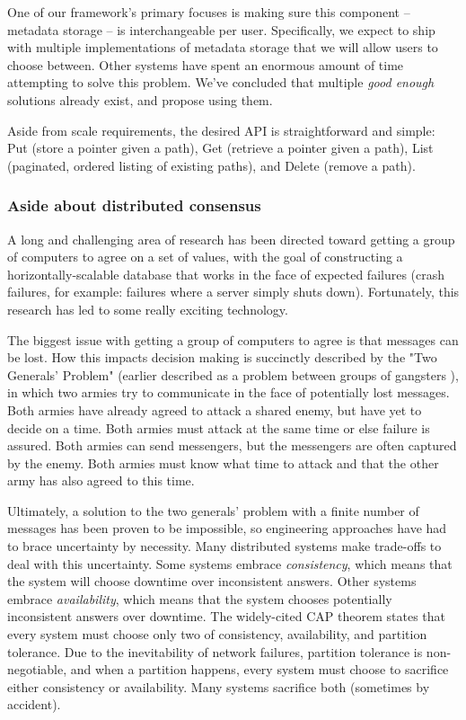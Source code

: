 \documentclass[a4paper,10pt]{article} \usepackage[utf8]{inputenc}
\begin{document}
One of our framework's primary focuses is making sure this component -- metadata
storage -- is interchangeable per user. Specifically, we expect to ship with
multiple implementations of metadata storage that we will allow users to choose
between. Other systems have spent an enormous amount of time attempting to solve
this problem. We've concluded that multiple {\em good enough} solutions already
exist, and propose using them.

Aside from scale requirements, the desired API is straightforward and
simple: Put (store a pointer given a path), Get (retrieve a pointer given a
path), List (paginated, ordered listing of existing paths), and Delete (remove a
path).



\subsubsection{Aside about distributed consensus}

A long and challenging area of research has been directed toward getting a
group of computers to agree on a set of values, with the goal of constructing a
horizontally-scalable database that works in the face of expected failures
(crash failures, for example: failures where a server simply shuts down).
Fortunately, this research has led to some really exciting technology.

The biggest issue with getting a group of computers to agree is that messages
can be lost. How this impacts decision making is succinctly described by the
"Two Generals' Problem" \cite{two-generals} (earlier described as a problem
between groups of gangsters \cite{two-gangsters}), in which two armies try to
communicate in the face of potentially lost messages. Both armies have already
agreed to attack a shared enemy, but have yet to decide on a time. Both armies
must attack at the same time or else failure is assured. Both armies can send
messengers, but the messengers are often captured by the enemy. Both armies must
know what time to attack and that the other army has also agreed to this time.

Ultimately, a solution to the two generals' problem with a finite number of
messages has been proven to be impossible, so engineering approaches have had
to brace uncertainty by necessity. Many distributed systems make trade-offs to
deal with this uncertainty. Some systems embrace {\em consistency}, which means
that the system will choose downtime over inconsistent answers. Other
systems embrace {\em availability}, which means that the system chooses
potentially inconsistent answers over downtime. The widely-cited CAP
theorem \cite{cap} states that every system must choose only two of consistency,
availability, and partition tolerance. Due to the inevitability of network
failures, partition tolerance is non-negotiable, and when a partition happens,
every system must choose to sacrifice either consistency or availability. Many
systems sacrifice both (sometimes by accident).
\end{document}
